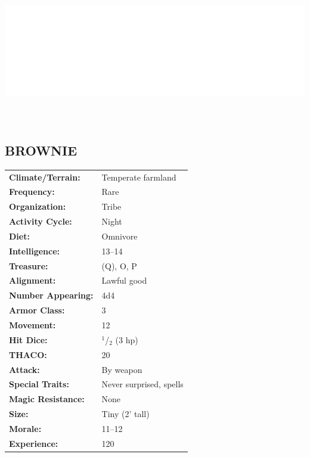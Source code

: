 \begin{multicols}{2}
\noindent\includegraphics[width=\columnwidth, height=2.5in]{testblock.pdf} 

\noindent \begin{minipage}{\columnwidth}

\vspace{1em}

\subsection{BROWNIE}

\noindent \begin{tabular}{p{}p{}}
\textbf{Climate/Terrain:}	& Temperate farmland \\
\textbf{Frequency:} 		& Rare \\
\textbf{Organization:} 		& Tribe \\
\textbf{Activity Cycle:} 	& Night \\
\textbf{Diet:} 				& Omnivore \\
\textbf{Intelligence:} 		& 13--14 \\
\textbf{Treasure:} 			& (Q), O, P \\
\textbf{Alignment:} 		& Lawful good \\
\hline
\textbf{Number Appearing:} 	& 4d4 \\
\textbf{Armor Class:} 		& 3 \\
\textbf{Movement:} 			& 12 \\
\textbf{Hit Dice:} 			& $^1$/$_2$ (3 hp) \\
\textbf{THACO:} 			& 20 \\
\textbf{Attack:} 			& By weapon \\
\textbf{Special Traits:} 	& Never surprised, spells \\
\textbf{Magic Resistance:} 	& None \\
\textbf{Size:} 				& Tiny (2' tall) \\
\textbf{Morale:} 			& 11--12 \\
\textbf{Experience:} 		& 120 \\ %
\end{tabular}


\end{minipage}
\end{multicols}
